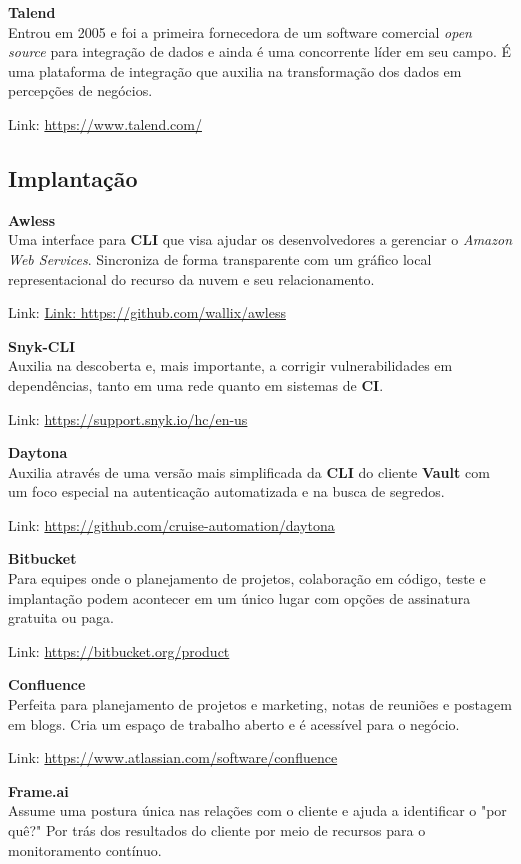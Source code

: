 \documentclass[fleqn,10pt]{../sty/SelfArx} %
\begin{document}
\textbf{Talend} \\
Entrou em 2005 e foi a primeira fornecedora de um software comercial \textit{open source} para integração de dados e ainda é uma concorrente líder em seu campo. É uma plataforma de integração que auxilia na transformação dos dados em percepções de negócios. 

Link: \url{https://www.talend.com/}

\subsection*{Implantação}

\textbf{Awless} \\
Uma interface para \textbf{CLI} que visa ajudar os desenvolvedores a gerenciar o \textit{Amazon Web Services}. Sincroniza de forma transparente com um gráfico local representacional do recurso da nuvem e seu relacionamento.

Link: \url{Link: https://github.com/wallix/awless}

\textbf{Snyk-CLI} \\
Auxilia na descoberta e, mais importante, a corrigir vulnerabilidades em dependências, tanto em uma rede quanto em sistemas de \textbf{CI}.

Link: \url{https://support.snyk.io/hc/en-us}

\textbf{Daytona} \\
Auxilia através de uma versão mais simplificada da \textbf{CLI} do cliente \textbf{Vault} com um foco especial na autenticação automatizada e na busca de segredos.

Link: \url{https://github.com/cruise-automation/daytona}

\textbf{Bitbucket} \\
Para equipes onde o planejamento de projetos, colaboração em código, teste e implantação podem acontecer em um único lugar com opções de assinatura gratuita ou paga.

Link: \url{https://bitbucket.org/product}

\textbf{Confluence} \\
Perfeita para planejamento de projetos e marketing, notas de reuniões e postagem em blogs. Cria um espaço de trabalho aberto e é acessível para o negócio.

Link: \url{https://www.atlassian.com/software/confluence}

\textbf{Frame.ai} \\
Assume uma postura única nas relações com o cliente e ajuda a identificar o "por quê?" Por trás dos resultados do cliente por meio de recursos para o monitoramento contínuo.
\end{document}
